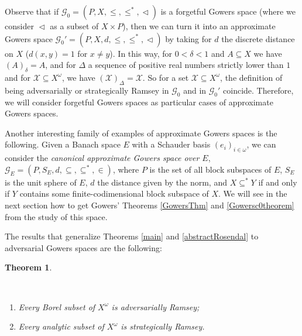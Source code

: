 \documentclass[a4paper,11pt]{article}
\makeatletter
\newtheorem{thm}{Theorem}[section]
\theoremstyle{definition}
\numberwithin{equation}{section}
\newcommand{\X}{\mathcal{X}}
\newcommand{\G}{\mathcal{G}}
\newcommand{\alaligne}{~\vspace*{\topsep}\nobreak\@afterheading}
\makeatother
\begin{document}
Observe that if $\G_0 = (P, X, \leqslant, \leqslant^*, \vartriangleleft)$ is a forgetful Gowers space (where we consider $\vartriangleleft$ as a subset of $X \times P$), then we can turn it into an approximate Gowers space $\G_0' = (P, X, d, \leqslant, \leqslant^*, \vartriangleleft)$ by taking for $d$ the discrete distance on $X$ ($d(x, y) = 1$ for $x \neq y$). In this way, for $0 < \delta < 1$ and $A \subseteq X$ we have $(A)_\delta = A$, and for $\Delta$ a sequence of positive real numbers strictly lower than $1$ and for $\X \subseteq X^\omega$, we have $(\X)_\Delta = \X$. So for a set $\X \subseteq X^\omega$, the definition of being adversarially or strategically Ramsey in $\G_0$ and in $\G_0'$ coincide. Therefore, we will consider forgetful Gowers spaces as particular cases of approximate Gowers spaces.

\smallskip

Another interesting family of examples of approximate Gowers spaces is the following. Given a Banach space $E$ with a Schauder basis $(e_i)_{i \in \omega}$, we can consider the \emph{canonical approximate Gowers space over $E$}, $\G_E = (P, S_E, d, \subseteq, \subseteq^*, \in)$, where $P$ is the set of all block subspaces of $E$, $S_E$ is the unit sphere of $E$, $d$ the distance given by the norm, and $X \subseteq^* Y$ if and only if $Y$ contains some finite-codimensional block subspace of $X$. We will see in the next section how to get Gowers' Theorems \ref{GowersThm} and \ref{Gowersc0theorem} from the study of this space.

\smallskip

The results that generalize Theorems \ref{main} and \ref{abstractRosendal} to adversarial Gowers spaces are the following:

\begin{thm}\label{ThmApproxRamsey}

\alaligne

\begin{enumerate}

\item Every Borel subset of $X^\omega$ is adversarially Ramsey;

\item Every analytic subset of $X^\omega$ is strategically Ramsey.

\end{enumerate}

\end{thm}
\end{document}
